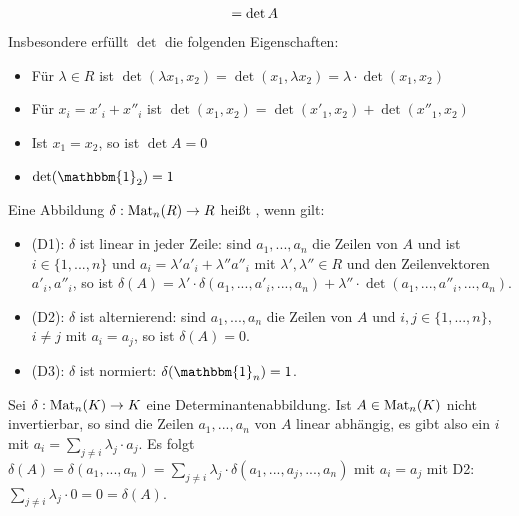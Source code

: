 \begin{remark}
\begin{align}
	&= \det A \notag
	\end{align}
	Insbesondere erfüllt $\det$ die folgenden Eigenschaften: 
	\begin{itemize}
		\item Für $\lambda\in R$ ist $\det(\lambda x_1,x_2)=\det(x_1,\lambda x_2)=\lambda\cdot \det(x_1,x_2)$
		\item Für $x_i=x'_i+x''_i$ ist $\det(x_1,x_2)=\det(x'_1,x_2) + \det(x''_1,x_2)$
		\item Ist $x_1=x_2$, so ist $\det A=0$
		\item $\det(\mathbbm{1}_2)=1$
	\end{itemize}
\end{remark}

\begin{definition}[Determinantenabbildung]
	Eine Abbildung $\delta:\operatorname{Mat}_n(R)\to R$ heißt , wenn gilt:
	\begin{itemize}
		\item (D1): $\delta$ ist linear in jeder Zeile: sind $a_1,...,a_n$ die Zeilen von $A$ und ist $i\in \{1,...,n\}$ und $a_i=\lambda'a'_i + 
		\lambda''a''_i$ mit $\lambda',\lambda''\in R$ und den Zeilenvektoren $a'_i,a''_i$, so ist $\delta(A)=\lambda'\cdot \delta(a_1,...,
		a'_i,...,a_n) + \lambda''\cdot \det(a_1,...,a''_i,...,a_n)$.
		\item (D2): $\delta$ ist alternierend: sind $a_1,...,a_n$ die Zeilen von $A$ und $i,j\in \{1,...,n\}$, $i\neq j$ mit $a_i=a_j$, so ist 
		$\delta(A)=0$.
		\item (D3): $\delta$ ist normiert: $\delta(\mathbbm{1}_n)=1$.
	\end{itemize}
\end{definition}

\begin{example}
	Sei $\delta:\operatorname{Mat}_n(K)\to K$ eine Determinantenabbildung. Ist $A\in \operatorname{Mat}_n(K)$ nicht invertierbar, so sind die Zeilen 
	$a_1,...,a_n$ von $A$ linear abhängig, es gibt also ein $i$ mit $a_i=\sum_{j\neq i} \lambda_j\cdot a_j$. Es folgt $\delta(A)=
	\delta(a_1,...,a_n)=\sum_{j\neq i} \lambda_j\cdot \delta(a_1,...,a_j,...,a_n)$ mit $a_i=a_j$ mit D2: $\sum_{j\neq i} 
	\lambda_j\cdot 0=0=\delta(A)$.
\end{example}

